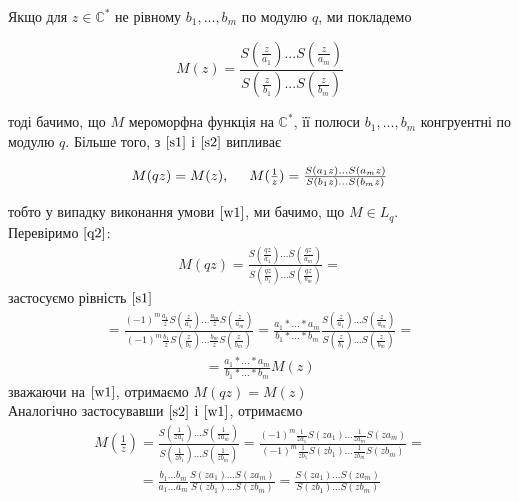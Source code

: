 \documentclass[12pt,a4paper]{article}
\begin{document}
Якщо для $z \in \mathbb{C}^{*}$ не рівному $b_{1},...,b_{m}$ по модулю $q $, ми покладемо
\begin{center}
\[ M(z)=\frac{S(\frac{z}{a_{1}})...S(\frac{z}{a_{m}})}{S(\frac{z}{b_{1}})...S(\frac{z}{b_{m}})}\]\label{M(z)}
\end{center}
тоді бачимо, що $M$ мероморфна функція на $\mathbb{C}^{*}$, її полюси $b_{1},...,b_{m}$ конгруентні по модулю $q$. Більше того, з $\eqref{s1}$ і $\eqref{s2}$ випливає

\begin{equation}\label{q2}
\begin{array}{l} 
 M(qz)=M(z), \hspace{0,5cm} M(\frac{1}{z})=\frac{S(a_{1}z)...S(a_{m}z)}{S(b_{1}z)...S(b_{m}z)}     
\end{array}
\end{equation}  
 
тобто у випадку виконання умови  $\eqref{w1}$, ми бачимо, що $M\in L_{q}$.\\
Перевіримо $\eqref{q2}$:\\  
 \[\begin{array}{l}
 M(qz)=\frac{S(\frac{qz}{a_{1}})...S(\frac{qz}{a_{m}})}{S(\frac{qz}{b_{1}})...S(\frac{qz}{b_{m}})}=
 \end{array}\]
 застосуємо рівність $\eqref{s1}$
\[\begin{array}{l}
=\frac{ (-1)^{m} \frac{a_{1}}{z} S(\frac{z}{a_{1}})...\frac{a_{m}}{z} S(\frac{z}{a_{m}}) }{ (-1)^{m} \frac{b_{1}}{z} S(\frac{z}{b_{1}})...\frac{b_{m}}{z} S(\frac{z}{b_{m}}) }

=\frac{ a_{1}*...*a_{m}}{b_{1}*...*b_{m}}\frac{S(\frac{z}{a_{1}})...S(\frac{z}{a_{m}})}{S(\frac{z}{b_{1}})...S(\frac{z}{b_{m}})}=
\end{array}\]
\[\begin{array}{l}
=\frac{ a_{1}*...*a_{m}}{b_{1}*...*b_{m}}M(z) 
\end{array}\]
зважаючи на $\eqref{w1}$, отримаємо
$M(qz)=M(z)$\\

Аналогічно застосувавши $\eqref{s2}$ і $\eqref{w1}$, отримаємо\\
\[\begin{array}{l}
M(\frac{1}{z})=\frac{S(\frac{1}{za_{1}})...S(\frac{1}{za_{m}})}{S(\frac{1}{zb_{1}})...S(\frac{1}{zb_{m}})}= 
\frac{(-1)^m \frac{1}{za_{1}} S(za_{1})...\frac{1}{za_{m}} S(za_{m})}{(-1)^m \frac{1}{zb_{1}} S(zb_{1})...\frac{1}{zb_{m}} S(zb_{m})}=
\end{array}\]
\[\begin{array}{l}
= \frac{b_{1}...b_{m}}{a_{1}...a_{m}}
\frac{ S(za_{1})...S(za_{m})}{S(zb_{1})...S(zb_{m})}=\frac{ S(za_{1})...S(za_{m})}{S(zb_{1})...S(zb_{m})}  
\end{array} \]
\vspace{1,5cm}
\end{document}
